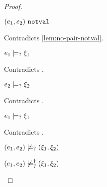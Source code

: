 \begin{proof}
\begin{byCases}
\begin{byCases}
\begin{byCases}
\begin{byCases}
\begin{pfsteps*}
                \item $(e_1 , e_2) ~\mathtt{notval}$ 
                \end{pfsteps*}
                Contradicts \autoref{lem:no-pair-notval}.
            \item[\text{(\ref{rule:CMSPair1})}]
                \begin{pfsteps*}
                \item $e_1 \models_{?} \xi_1$ 
                \end{pfsteps*}
                Contradicts .
            \item[\text{(\ref{rule:CMSPair2})}]
                \begin{pfsteps*}
                \item $e_2 \models_{?} \xi_2$ 
                \end{pfsteps*}
                Contradicts .
            \item[\text{(\ref{rule:CMSPair3})}]
                \begin{pfsteps*}
                \item $e_1 \models_{?} \xi_1$ 
                \end{pfsteps*}
                Contradicts .
            \end{byCases}
            \begin{pfsteps*}
            \item $(e_1 , e_2) \not\models_{?} (\xi_1 , \xi_2)$  
            \item $(e_1 , e_2) \not\models_{?}^{\dag} (\xi_1 , \xi_2)$ 
            \end{pfsteps*}
            

\end{byCases}
\end{byCases}
\end{byCases}
\end{proof}
